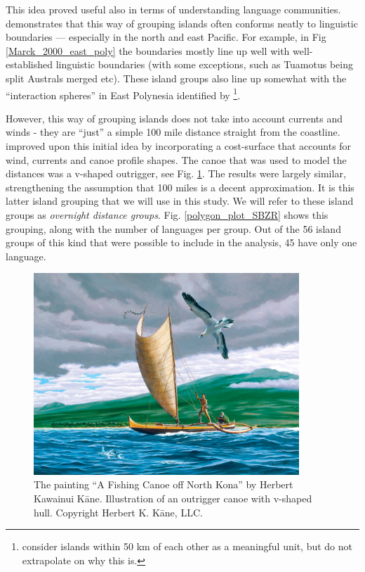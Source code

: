 \documentclass[12pt,letterpaper]{article}
\begin{document}
This idea proved useful also in terms of understanding language communities. \citet{mark_1986, marck2000} demonstrates that this way of grouping islands often conforms neatly to linguistic boundaries --- especially in the north and east Pacific. For example, in Fig  \ref{Marck_2000_east_poly} the boundaries mostly line up well with well-established linguistic boundaries (with some exceptions, such as Tuamotus being split Australs merged etc). These island groups also line up somewhat with the ``interaction spheres'' in East Polynesia identified by \citet{rolett2002voyaging}\footnote{\citet{rolett2004environmental} consider islands within 50 km of each other as a meaningful unit, but do not extrapolate on why this is.}. 

However, this way of grouping islands does not take into account currents and winds - they are ``just'' a simple 100 mile distance straight from the coastline. \citet{NZSA_overnight_2023} improved upon this initial idea by incorporating a cost-surface that accounts for wind, currents and canoe profile shapes. The canoe that was used to model the distances was a v-shaped outrigger, see Fig. \ref{kane_fishing_canoe}. The results were largely similar, strengthening the assumption that 100 miles is a decent approximation. It is this latter island grouping that we will use in this study. We will refer to these island groups as \textit{overnight distance groups}. Fig. \ref{polygon_plot_SBZR} shows this grouping, along with the number of languages per group. Out of the 56 island groups of this kind that were possible to include in the analysis, 45 have only one language.

\begin{figure}[ht]
\centering
\includegraphics[width=10cm]{Herb-Kane_Fishing-Canoe-off-North-Kona.jpg}
\caption{{The painting ``A Fishing Canoe off North Kona'' by Herbert Kawainui K{\=a}ne. Illustration of an outrigger canoe with v-shaped hull. Copyright Herbert K. K{\=a}ne, LLC.}}
\label{kane_fishing_canoe}
\end{figure}
\end{document}
